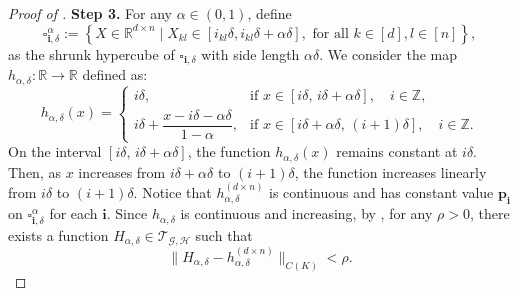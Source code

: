 \documentclass{article}
\begin{document}
\begin{proof}[Proof of ]
    \medskip
    \noindent \textbf{Step 3.}
    For any $\alpha\in (0,1)$, define
    \begin{equation}
        \square_{\mathbf i, \delta}^\alpha:=\left\{X\in \mathbb R^{d\times n}\mid X_{kl}\in [i_{kl}\delta, i_{kl}\delta+\alpha \delta], \text{ for all } k\in [d], l\in [n]\right\},
    \end{equation}
    as the shrunk hypercube of $\square_{\mathbf i, \delta}$ with side length $\alpha\delta$.
    We consider the map $h_{\alpha,\delta}:\mathbb R\to \mathbb R$ defined as:
    \begin{equation}
        h_{\alpha,\delta}(x)=
        \begin{cases}
        i\delta, & \text{if } x\in [i\delta,\, i\delta+\alpha\delta],\quad i\in\mathbb{Z},\\[1mm]
        i\delta+\dfrac{x-i\delta-\alpha\delta}{1-\alpha}, & \text{if } x\in [i\delta+\alpha\delta,\, (i+1)\delta],\quad i\in\mathbb{Z}.
        \end{cases}
    \end{equation}
    On the interval \([i\delta,\, i\delta+\alpha\delta]\), the function \(h_{\alpha,\delta}(x)\) remains constant at \(i\delta\). Then, as \(x\) increases from \(i\delta+\alpha\delta\) to \((i+1)\delta\), the function increases linearly from \(i\delta\) to \((i+1)\delta\). Notice that $h_{\alpha,\delta}^{(d\times n)}$ is continuous and has constant value $\bm p_{\mathbf i}$ on $\square_{\mathbf i, \delta}^\alpha$ for each $\mathbf i$.
    Since \(h_{\alpha,\delta}\) is continuous and increasing, by , for any $\rho>0$,  there exists a function \(H_{\alpha,\delta}\in\mathcal{T}_{\mathcal{G}, \mathcal{H}}\) such that
    \begin{equation}
        \|H_{\alpha,\delta}-h_{\alpha,\delta}^{(d\times n)}\|_{C(K)}< \rho.
    \end{equation}


\end{proof}
\end{document}
